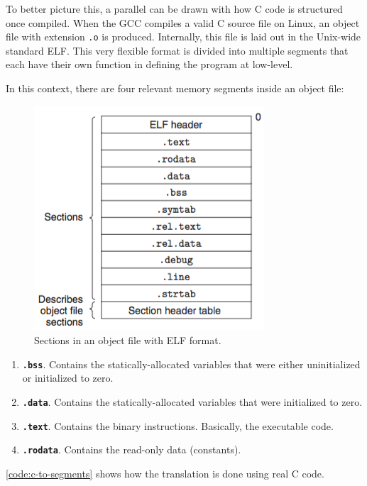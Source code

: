 {To better picture this, a parallel can be drawn with how C code is structured once compiled. When the \gls{GCC} compiles a valid C source file on Linux, an object file with extension \texttt{.o} is produced. Internally, this file is laid out in the Unix-wide standard \gls{ELF}. This very flexible format is divided into multiple segments that each have their own function in defining the program at low-level.

In this context, there are four relevant memory segments inside an object file:
\begin{figure}
	\centering 
	\includegraphics[width=.9\linewidth,keepaspectratio]{art/reloc-obj.png}
	\caption{Sections in an object file with ELF format.\cite{online:zhang}}
	\label{fig:sections-obj}
	\vspace{-24pt}
\end{figure}
\begin{enumerate}
	\item \textbf{\texttt{.bss}}. Contains the statically-allocated variables that were either uninitialized or initialized to zero.
	\item \textbf{\texttt{.data}}. Contains the statically-allocated variables that were initialized to zero.
	\item \textbf{\texttt{.text}}. Contains the binary instructions. Basically, the executable code.
	\item \textbf{\texttt{.rodata}}. Contains the read-only data (constants).
\end{enumerate}
\autoref{code:c-to-segments} shows how the translation is done using real C code.

}
